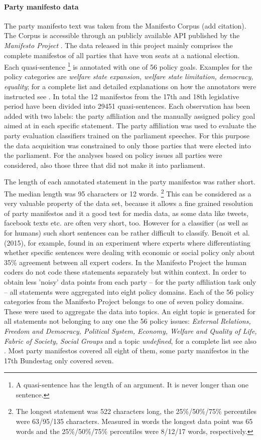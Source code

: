 \documentclass{article}
\begin{document}
\paragraph{Party manifesto data}
The party manifesto text was taken from the Manifesto Corpus (add citation). The Corpus is accessible through an publicly available API published by the {\em Manifesto Project} \cite{manifesto}. The data released in this project mainly comprises the complete manifestos of all parties that have won seats at a national election. Each quasi-sentence \footnote{A quasi-sentence has the length of an argument. It is never longer than one sentence.} is annotated with one of 56 policy goals. Examples for the policy categories are {\em welfare state expansion, welfare state limitation, democracy, equality}; for a complete list and detailed explanations on how the annotators were instructed see \cite{leftright}. In total the 12 manifestos from the 17th and 18th legislative period have been divided into 29451 quasi-sentences. Each observation has been added with two labels: the party affiliation and the manually assigned policy goal aimed at in each specific statement. The party affiliation was used to evaluate the party evaluation classifiers trained on the parliament speeches. For this purpose the data acquisition was constrained to only those parties that were elected into the parliament. For the analyses based on policy issues all parties were considered, also those three that did not make it into parliament.

The length of each annotated statement in the party manifestos was rather short. The median length was 95 characters or 12 words. \footnote{The longest statement was 522 characters long, the 25\%/50\%/75\% percentiles were 63/95/135 characters. Measured in words the longest data point was 65 words and the 25\%/50\%/75\% percentiles were 8/12/17 words, respectively.} This can be considered as a very valuable property of the data set, because it allows a fine grained resolution of party manifestos and it a good test for media data, as some data like tweets, facebook texts etc. are often very short, too. However for a classifier (as well as for humans) such short sentences can be rather difficult to classify. Benoit et al. (2015), for example, found in an experiment where experts where differentiating whether specific sentences were dealing with economic or social policy only about 35\% agreement between all expert coders. In the Manifesto Project the human coders do not code these statements separately but within context. In order to obtain less 'noisy' data points from each party -- for the party affiliation task only -- all statements were aggregated into eight policy domains. Each of the 56 policy categories from the Manifesto Project belongs to one of seven policy domains. These were used to aggregate the data into topics. An eight topic is generated for all statements not belonging to any one the 56 policy issues: {\em External Relations, Freedom and Democracy, Political System, Economy, Welfare and Quality of Life, Fabric of Society, Social Groups} and a topic {\em undefined}, for a complete list see also \cite{leftright}. Most party manifestos covered all eight of them, some party manifestos in the 17th Bundestag only covered seven.
\end{document}
